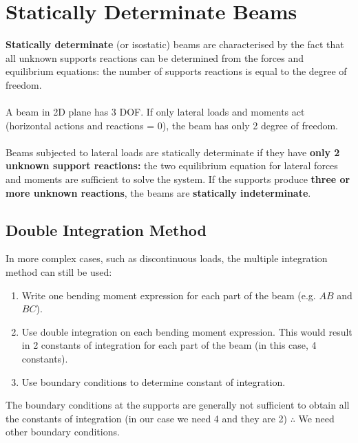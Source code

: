 \section{Statically Determinate Beams}
\textbf{Statically determinate} (or isostatic) beams are characterised by the fact that all unknown supports reactions can be determined from the forces and equilibrium equations: the number of supports reactions is equal to the degree of freedom. \\\\
A beam in 2D plane has 3 DOF. If only lateral loads and moments act (horizontal actions and reactions = 0), the beam has only 2 degree of freedom. \\\\
Beams subjected to lateral loads are statically determinate if they have \textbf{only 2 unknown support reactions:} the two equilibrium equation for lateral forces and moments are sufficient to solve the system. If the supports produce \textbf{three or more unknown reactions}, the beams are \textbf{statically indeterminate}.
\subsection{Double Integration Method}
In more complex cases, such as discontinuous loads, the multiple integration method can still be used:
\begin{enumerate}
  \item Write one bending moment expression for each part of the beam (e.g. $AB$ and $BC$).
  \item Use double integration on each bending moment expression. This would result in 2 constants of integration for each part of the beam (in this case, 4 constants).
  \item Use boundary conditions to determine constant of integration.
\end{enumerate}
The boundary conditions at the supports are generally not sufficient to obtain all the constants of integration (in our case we need 4 and they are 2) $\therefore$ We need other boundary conditions.
